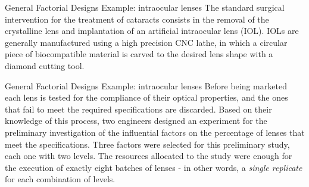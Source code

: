 \documentclass[t]{beamer}
\begin{document}
\begin{ftst}
{General Factorial Designs}
{Example: intraocular lenses}
The standard surgical intervention for the treatment of cataracts consists in the removal of the crystalline lens and implantation of an artificial intraocular lens (IOL). IOLs are generally manufactured using a high precision CNC lathe, in which a circular piece of biocompatible material is carved to the desired lens shape with a diamond cutting tool.

\end{ftst}


\begin{ftst}
{General Factorial Designs}
{Example: intraocular lenses}
Before being marketed each lens is tested for the compliance of their optical properties, and the ones that fail to meet the required specifications are discarded.
\vone
Based on their knowledge of this process, two engineers designed an experiment for the preliminary investigation of the influential factors on the percentage of lenses that meet the specifications.
\vone
Three factors were selected for this preliminary study, each one with two levels. The resources allocated to the study were enough for the execution of exactly eight batches of lenses - in other words, a \textit{single replicate} for each combination of levels.
\end{ftst}
\end{document}
